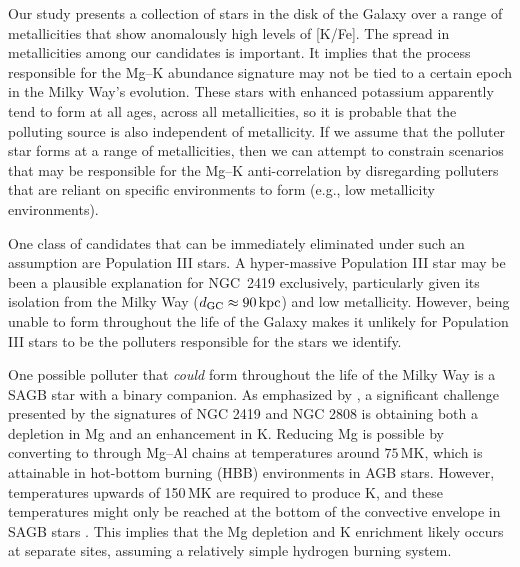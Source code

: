 \documentclass[a4paper,fleqn,usenatbib]{mnras}
\begin{document}
Our study presents a collection of stars in the disk of the Galaxy over a range of metallicities that show anomalously high levels of [K/Fe]. The spread in metallicities among our candidates is important. It implies that the process responsible for the Mg--K abundance signature may not be tied to a certain epoch in the Milky Way's evolution. These stars with enhanced potassium apparently tend to form at all ages, across all metallicities, so it is probable that the polluting source is also independent of metallicity. If we assume that the polluter star forms at a range of metallicities, then we can attempt to constrain scenarios that may be responsible for the Mg--K anti-correlation by disregarding polluters that are reliant on specific environments to form (e.g., low metallicity environments).

One class of candidates that can be immediately eliminated under such an assumption are Population III stars. A hyper-massive Population III star may be been a plausible explanation for NGC~2419 \citep{carretta2013} exclusively, particularly given its isolation from the Milky Way ($d_{\rm GC} \approx 90\,{\rm kpc}$) and low metallicity. However, being unable to form throughout the life of the Galaxy makes it unlikely for Population III stars to be the polluters responsible for the stars we identify.

One possible polluter that \textit{could} form throughout the life of the Milky Way is a SAGB star with a binary companion. As emphasized by \cite{prantzos2017}, a significant challenge presented by the signatures of NGC 2419 and NGC 2808 is obtaining both a depletion in Mg and an enhancement in K. Reducing Mg is possible by converting  to  through Mg--Al chains at temperatures around $75\,$MK, which is attainable in hot-bottom burning (HBB) environments in AGB stars. However, temperatures upwards of 150\,MK are required to produce K, and these temperatures might only be reached at the bottom of the convective envelope in SAGB stars \citep{iliadis2016}. This implies that the Mg depletion and K enrichment likely occurs at separate sites, assuming a relatively simple hydrogen burning system. 
\end{document}
